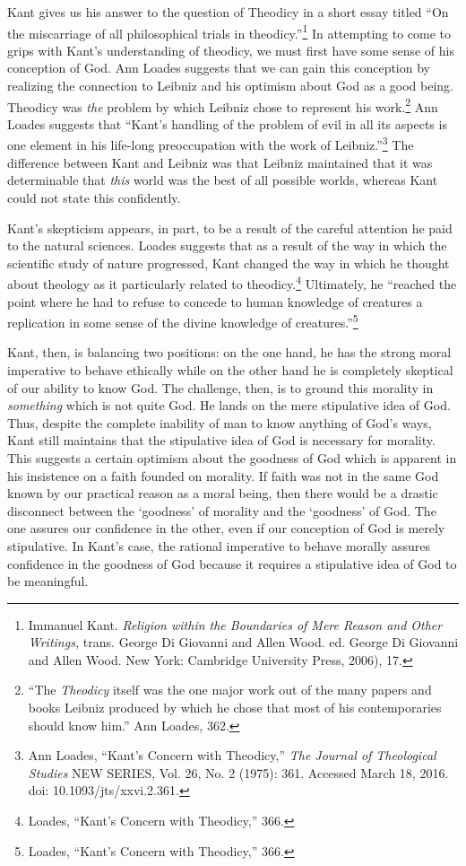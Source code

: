 \documentclass[12pt]{article}
\begin{document}
	Kant gives us his answer to the question of Theodicy in a short essay titled ``On the miscarriage of all philosophical trials in theodicy.''\footnote{Immanuel Kant. \emph{Religion within the Boundaries of Mere Reason and Other Writings,} trans. George Di Giovanni and Allen Wood. ed. George Di Giovanni and Allen Wood. New York: Cambridge University Press, 2006), 17.} In attempting to come to grips with Kant's understanding of theodicy, we must first have some sense of his conception of God. Ann Loades suggests that we can gain this conception by realizing the connection to Leibniz and his optimism about God as a good being. Theodicy was \emph{the} problem by which Leibniz chose to represent his work.\footnote{``The \emph{Theodicy} itself was the one major work out of the many papers and books Leibniz produced by which he chose that most of his contemporaries should know him.'' Ann Loades, 362.} Ann Loades suggests that ``Kant's handling of the problem of evil in all its aspects is one element in his life-long preoccupation with the work of Leibniz.''\footnote{Ann Loades, ``Kant's Concern with Theodicy,'' \emph{The Journal of Theological Studies} NEW SERIES, Vol. 26, No. 2 (1975): 361. Accessed March 18, 2016. doi: 10.1093/jts/xxvi.2.361.} The difference between Kant and Leibniz was that Leibniz maintained that it was determinable that \emph{this} world was the best of all possible worlds, whereas Kant could not state this confidently. 
	
	Kant's skepticism appears, in part, to be a result of the careful attention he paid to the natural sciences. Loades suggests that as a result of the way in which the scientific study of nature progressed, Kant changed the way in which he thought about theology as it particularly related to theodicy.\footnote{Loades, ``Kant's Concern with Theodicy,'' 366.} Ultimately, he ``reached the point where he had to refuse to concede to human knowledge of creatures a replication in some sense of the divine knowledge of creatures.''\footnote{Loades, ``Kant's Concern with Theodicy,'' 366.} 
	
	Kant, then, is balancing two positions: on the one hand, he has the strong moral imperative to behave ethically while on the other hand he is completely skeptical of our ability to know God. The challenge, then, is to ground this morality in \emph{something} which is not quite God. He lands on the mere stipulative idea of God. Thus, despite the complete inability of man to know anything of God's ways, Kant still maintains that the stipulative idea of God is necessary for morality. This suggests a certain optimism about the goodness of God which is apparent in his insistence on a faith founded on morality. If faith was not in the same God known by our practical reason as a moral being, then there would be a drastic disconnect between the `goodness' of morality and the `goodness' of God. The one assures our confidence in the other, even if our conception of God is merely stipulative. In Kant's case, the rational imperative to behave morally assures confidence in the goodness of God because it requires a stipulative idea of God to be meaningful.
\end{document}
